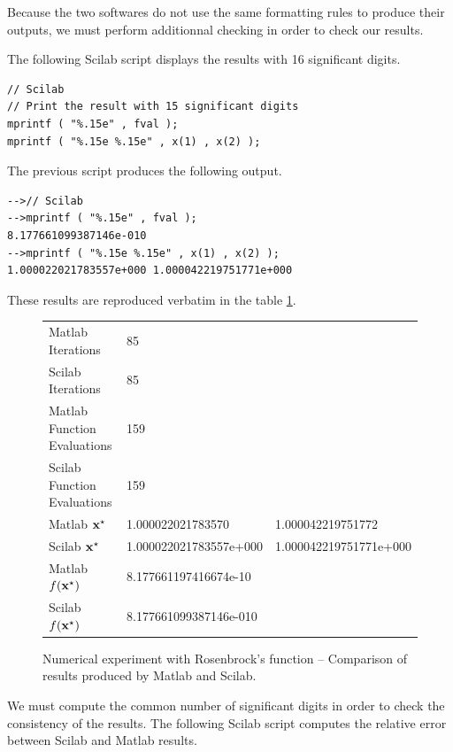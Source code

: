 Because the two softwares do not use the same formatting rules 
to produce their outputs, we must perform additionnal checking 
in order to check our results.

The following Scilab script displays the results with 16 significant digits.

\lstset{language=scilabscript}
\begin{lstlisting}
// Scilab
// Print the result with 15 significant digits
mprintf ( "%.15e" , fval );
mprintf ( "%.15e %.15e" , x(1) , x(2) );
\end{lstlisting}

The previous script produces the following output.

\lstset{language=scilabscript}
\begin{lstlisting}
-->// Scilab
-->mprintf ( "%.15e" , fval );
8.177661099387146e-010 
-->mprintf ( "%.15e %.15e" , x(1) , x(2) );
1.000022021783557e+000 1.000042219751771e+000 
\end{lstlisting}

These results are reproduced verbatim in the table 
\ref{fig-fminsearch-comparison}.

\begin{figure}[htbp]
\begin{center}
\begin{tabular}{|l|l|l|}
\hline
Matlab Iterations & 85 &\\
Scilab Iterations & 85 &\\
\hline
Matlab Function Evaluations & 159 &\\
Scilab Function Evaluations & 159 &\\
\hline
Matlab $\mathbf{x}^\star$ & 1.000022021783570   & 1.000042219751772 \\
Scilab $\mathbf{x}^\star$ & 1.000022021783557e+000 & 1.000042219751771e+000 \\
\hline
Matlab $f(\mathbf{x}^\star)$ & 8.177661197416674e-10 &\\
Scilab $f(\mathbf{x}^\star)$ & 8.177661099387146e-010  &\\
\hline
\end{tabular}
\end{center}
\caption{Numerical experiment with Rosenbrock's function -- Comparison of 
results produced by Matlab and Scilab.}
\label{fig-fminsearch-comparison}
\end{figure}

We must compute the common number of significant digits 
in order to check the consistency of the results.
The following Scilab script computes the relative error 
between Scilab and Matlab results.

